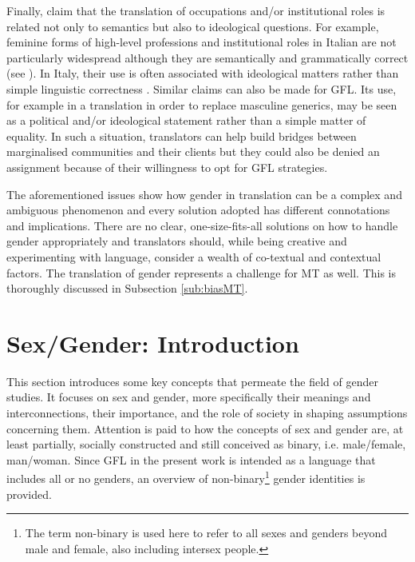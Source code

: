 Finally, \textcite[369]{di2020grammatical} claim that the translation of occupations and/or institutional roles is related not only to semantics but also to ideological questions. For example, feminine forms of high-level professions and institutional roles in Italian are not particularly widespread although they are semantically and grammatically correct (see \cite{gheno2019femminili}). In Italy, their use is often associated with ideological matters rather than simple linguistic correctness \citep[112]{gheno2019femminili}. Similar claims can also be made for GFL. Its use, for example in a translation in order to replace masculine generics, may be seen as a political and/or ideological statement rather than a simple matter of equality. In such a situation, translators can help build bridges between marginalised communities and their clients but they could also be denied an assignment because of their willingness to opt for GFL strategies.

The aforementioned issues show how gender in translation can be a complex and ambiguous phenomenon and every solution adopted has different connotations and implications. There are no clear, one-size-fits-all solutions on how to handle gender appropriately and translators should, while being creative and experimenting with language, consider a wealth of co-textual and contextual factors. The translation of gender represents a challenge for MT as well. This is thoroughly discussed in Subsection \ref{sub:biasMT}.  

\section{Sex/Gender: Introduction} \label{sec:sex/gender}

This section introduces some key concepts that permeate the field of gender studies. It focuses on sex and gender, more specifically their meanings and interconnections, their importance, and the role of society in shaping assumptions concerning them. Attention is paid to how the concepts of sex and gender are, at least partially, socially constructed and still conceived as binary, i.e. male/female, man/woman. Since GFL in the present work is intended as a language that includes all or no genders, an overview of non-binary\footnote{The term non-binary is used here to refer to all sexes and genders beyond male and female, also including intersex people.} gender identities is provided. 


